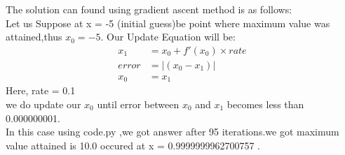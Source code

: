 \begin{enumerate}[label=\thesection.\arabic*.,ref=\thesection.\theenumi]
    The solution can found using gradient ascent method is as follows: \\
    Let us Suppose at x = -5 (initial guess)be point where maximum value was attained,thus $x_0 = -5$.
    Our Update Equation will be: 
    \begin{align}
        x_1 &= x_0 + f'(x_0) \times rate \\
        error &= \lvert (x_0 - x_1) \rvert\\
        x_0 &= x_1 
    \end{align}
    Here, rate = 0.1 \\
    we do update our $x_0$ until error between $x_0$ and $x_1$ becomes less than 0.000000001. \\
    In this case using code.py ,we got answer after 95 iterations.we got maximum value  attained is 10.0 occured at x = 0.9999999962700757 .
    
    
\end{enumerate}